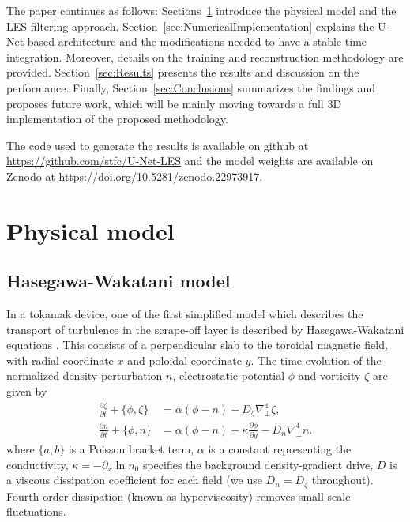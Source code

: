 \documentclass[authoryear,preprint,review,12pt]{elsarticle}
\begin{document}
The paper continues as follows: Sections~\ref{sec:PhysicalModel} introduce the physical model and the LES filtering approach. Section~\ref{sec:NumericalImplementation} explains the U-Net based architecture and the modifications needed to have a stable time integration. Moreover, details on the training and reconstruction methodology are provided. Section~\ref{sec:Results} presents the results and discussion on the performance. Finally, Section~\ref{sec:Conclusions} summarizes the findings and proposes future work, which will be mainly moving towards a full 3D implementation of the proposed methodology.

The code used to generate the results is available on github at \url{https://github.com/stfc/U-Net-LES} and the model weights are available on Zenodo at \url{https://doi.org/10.5281/zenodo.22973917}.
%
%
%
%
%
%
%
\section{Physical model}\label{sec:PhysicalModel}

\subsection{Hasegawa-Wakatani model}
In a tokamak device, one of the first simplified model which describes the transport of turbulence in the scrape-off layer is described by Hasegawa-Wakatani equations \citep{hasegawa_self-organization_1987}. This consists of a perpendicular slab to the toroidal magnetic field, with radial coordinate $x$ and poloidal coordinate $y$. The time evolution of the normalized density perturbation $n$, electrostatic potential $\phi$ and vorticity $\zeta$ are given by
\begin{align}
    \frac{\partial\zeta}{\partial t}+\{\phi,\zeta\}
    &=\alpha(\phi-n)-D_\zeta\nabla_\perp^4\zeta,
    \label{eq:hw_vorticity}\\
    \frac{\partial n}{\partial t}+\{\phi,n\}
    &=\alpha(\phi-n)-\kappa\frac{\partial\phi}{\partial y}
      -D_n\nabla_\perp^4 n.
    \label{eq:hw_density}
\end{align}
where $\{a,b\}$ is a Poisson bracket term, $\alpha$ is a constant representing the conductivity, $\kappa=-\partial_x\ln n_0$ specifies the background density-gradient drive, $D$ is a viscous dissipation coefficient for each field (we use $D_n=D_\zeta$ throughout). Fourth-order dissipation (known as hyperviscosity) removes small-scale fluctuations. 
\end{document}
